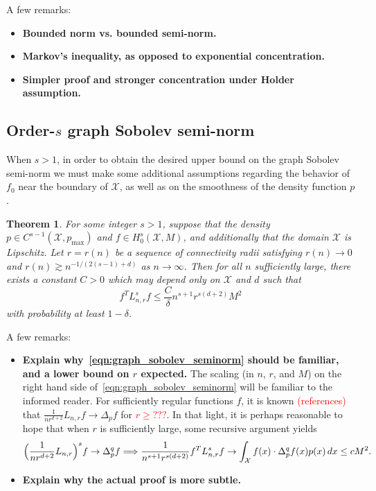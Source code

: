 \documentclass{article}
\newcommand{\1}{\mathbf{1}}
\newcommand{\Lap}{L}
\newcommand{\Xset}{\mathcal{X}}
\theoremstyle{alden}
\theoremstyle{aldenthm}
\newtheorem{theorem}{Theorem}
\theoremstyle{definition}
\theoremstyle{remark}
\begin{document}
A few remarks:
\begin{itemize}
	\item \textbf{Bounded norm vs. bounded semi-norm.}
	\item \textbf{Markov's inequality, as opposed to exponential concentration.}
	\item \textbf{Simpler proof and stronger concentration under Holder assumption.}
\end{itemize}

\subsection{Order-$s$ graph Sobolev semi-norm}

When $s > 1$, in order to obtain the desired upper bound on the graph Sobolev semi-norm we must make some additional assumptions regarding the behavior of $f_0$ near the boundary of $\Xset$, as well as on the smoothness of the density function $p$.
\begin{theorem}
	\label{thm:graph_sobolev_seminorm}
	For some integer $s > 1$, suppose that the density $p \in C^{s - 1}(\Xset,p_{\max})$ and $f \in H_0^s(\Xset,M)$, and additionally that the domain $\Xset$ is Lipschitz. Let $r = r(n)$ be a sequence of connectivity radii satisfying $r(n) \to 0$ and $r(n) \gtrsim n^{-1/(2(s - 1) +d)}$ as $n \to \infty$. Then for all $n$ sufficiently large, there exists a constant $C > 0$ which may depend only on $\Xset$ and $d$ such that
	\begin{equation}
	\label{eqn:graph_sobolev_seminorm}
	f^T \Lap_{n,r}^s f \leq \frac{C}{\delta} n^{s + 1} r^{s(d + 2)}M^2
	\end{equation}
	with probability at least $1 - \delta$.
\end{theorem}
A few remarks:
\begin{itemize}
	\item \textbf{Explain why~\eqref{eqn:graph_sobolev_seminorm} should be familiar, and a lower bound on $r$ expected.} The scaling (in $n$, $r$, and $M$) on the right hand side of~\eqref{eqn:graph_sobolev_seminorm} will be familiar to the informed reader. For sufficiently regular functions $f$, it is known \textcolor{red}{(references)} that $\frac{1}{nr^{d + 2}}\Lap_{n,r}f \to \Delta_pf$ for \textcolor{red}{$r \geq ???$}. In that light, it is perhaps reasonable to hope that when $r$ is sufficiently large, some recursive argument yields
	\begin{equation*}
	\Bigl(\frac{1}{nr^{d + 2}}\Lap_{n,r}\Bigr)^s f \to \Delta_p^qf \Longrightarrow \frac{1}{n^{s + 1} r^{s(d + 2)}} f^T \Lap_{n,r}^s f \to \int_{\Xset} f(x) \cdot  \Delta_p^qf(x) p(x) \,dx \leq c M^2.
	\end{equation*}
	\item \textbf{Explain why the actual proof is more subtle.}
\end{itemize}
\end{document}
